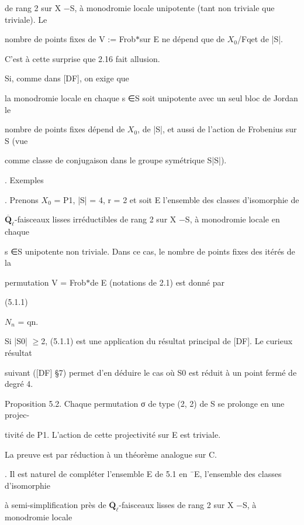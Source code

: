 \documentclass[11pt]{article}
\begin{document}
\noindent de rang 2 sur X −S, à monodromie locale unipotente (tant non triviale que triviale). Le\par
\noindent nombre de points fixes de V := Frob\(*\)sur E ne dépend que de \(X_0\)/Fqet de |S|.\par
\noindent C’est à cette surprise que 2.16 fait allusion.\par
\noindent Si, comme dans [DF], on exige que\par
\noindent la monodromie locale en chaque s ∈S soit unipotente avec un seul bloc de Jordan le\par
\noindent nombre de points fixes dépend de \(X_0\), de |S|, et aussi de l’action de Frobenius sur S (vue\par
\noindent comme classe de conjugaison dans le groupe symétrique S|S|).\par
{}. Exemples\par
{}. Prenons \(X_0\) = P1, |S| = 4, r = 2 et soit E l’ensemble des classes d’isomorphie de\par
\noindent \(\overline{\mathbf Q}_{\ell}\)-faisceaux lisses irréductibles de rang 2 sur X −S, à monodromie locale en chaque\par
\noindent s ∈S unipotente non triviale. Dans ce cas, le nombre de points fixes des itérés de la\par
\noindent permutation V = Frob\(*\)de E (notations de 2.1) est donné par\par
\noindent (5.1.1)\par
\noindent \(N_n\) = qn.\par
\noindent Si |S0| \(\geq\)2, (5.1.1) est une application du résultat principal de [DF]. Le curieux résultat\par
\noindent suivant ([DF] §7) permet d’en déduire le cas où S0 est réduit à un point fermé de degré 4.\par
\noindent Proposition 5.2. Chaque permutation σ de type (2, 2) de S se prolonge en une projec-\par
\noindent tivité de P1. L’action de cette projectivité sur E est triviale.\par
\noindent La preuve est par réduction à un théorème analogue sur C.\par
{}. Il est naturel de compléter l’ensemble E de 5.1 en ¯E, l’ensemble des classes d’isomorphie\par
\noindent à semi-simplification près de \(\overline{\mathbf Q}_{\ell}\)-faisceaux lisses de rang 2 sur X −S, à monodromie locale\par
\end{document}

